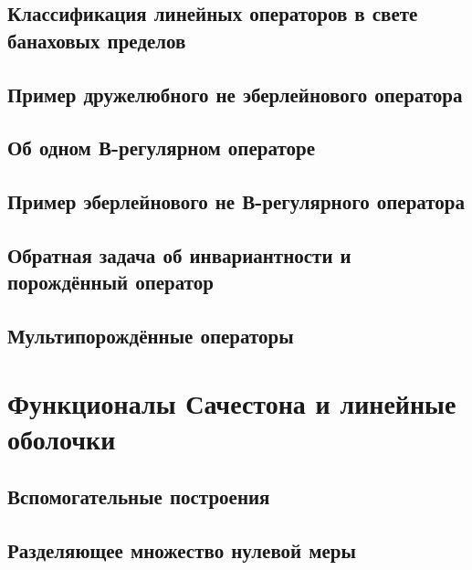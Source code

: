 \documentclass[12pt,a4paper,openbib]{report}
\theoremstyle{definition}
\begin{document}
	\section{Классификация линейных операторов в свете банаховых пределов}
	

	\section{Пример дружелюбного не эберлейнового оператора}
	

	\section{Об одном В-регулярном операторе}
	

	\section{Пример эберлейнового не В-регулярного оператора}
	

	\section{Обратная задача об инвариантности и порождённый оператор}
	

	\section{Мультипорождённые операторы}
	


\chapter{Функционалы Сачестона и линейные оболочки}

	

	\section{Вспомогательные построения}
	

	\section{Разделяющее множество нулевой меры}
	
\end{document}
